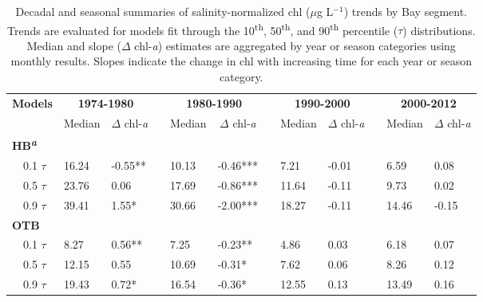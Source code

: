 \documentclass{svjour3}\usepackage[]{graphicx}\usepackage[]{color}
\newcommand{\mugl}{$\mu$g L$^{-1}$}
\begin{document}
\begin{table}[!tbp]
\caption{Decadal and seasonal summaries of salinity-normalized \ac{chl} (\mugl) trends by Bay segment. Trends are evaluated for models fit through the 10\textsuperscript{th}, 50\textsuperscript{th}, and 90\textsuperscript{th} percentile ($\tau$) distributions.  Median and slope ($\Delta$ chl-\textit{a}) estimates are aggregated by year or season categories using monthly results.  Slopes indicate the change in \ac{chl} with increasing time for each year or season category.\label{tab:trendsal}} 
\begin{center}
\begin{tabular}{lllcllcllcll}
\hline\hline
\multicolumn{1}{l}{\bfseries Models}&\multicolumn{2}{c}{\bfseries {\bf 1974-1980}}&\multicolumn{1}{c}{\bfseries }&\multicolumn{2}{c}{\bfseries {\bf 1980-1990}}&\multicolumn{1}{c}{\bfseries }&\multicolumn{2}{c}{\bfseries {\bf 1990-2000}}&\multicolumn{1}{c}{\bfseries }&\multicolumn{2}{c}{\bfseries {\bf 2000-2012}}\tabularnewline
\cline{2-3} \cline{5-6} \cline{8-9} \cline{11-12}
\multicolumn{1}{l}{}&\multicolumn{1}{c}{Median}&\multicolumn{1}{c}{$\Delta$ chl-\textit{a}}&\multicolumn{1}{c}{}&\multicolumn{1}{c}{Median}&\multicolumn{1}{c}{$\Delta$ chl-\textit{a}}&\multicolumn{1}{c}{}&\multicolumn{1}{c}{Median}&\multicolumn{1}{c}{$\Delta$ chl-\textit{a}}&\multicolumn{1}{c}{}&\multicolumn{1}{c}{Median}&\multicolumn{1}{c}{$\Delta$ chl-\textit{a}}\tabularnewline
\hline
{\bfseries HB\textsuperscript{\textit{a}}}&&&&&&&&&&&\tabularnewline
~~0.1 $\tau$&16.24&-0.55**&&10.13&-0.46***&& 7.21&-0.01 && 6.59& 0.08 \tabularnewline
~~0.5 $\tau$&23.76& 0.06 &&17.69&-0.86***&&11.64&-0.11 && 9.73& 0.02 \tabularnewline
~~0.9 $\tau$&39.41& 1.55*&&30.66&-2.00***&&18.27&-0.11 &&14.46&-0.15 \tabularnewline
\hline
{\bfseries OTB}&&&&&&&&&&&\tabularnewline
~~0.1 $\tau$& 8.27& 0.56**&& 7.25&-0.23**&& 4.86& 0.03 && 6.18& 0.07 \tabularnewline
~~0.5 $\tau$&12.15& 0.55 &&10.69&-0.31*&& 7.62& 0.06 && 8.26& 0.12 \tabularnewline
~~0.9 $\tau$&19.43& 0.72*&&16.54&-0.36*&&12.55& 0.13 &&13.49& 0.16 \tabularnewline

\end{tabular}
\end{center}
\end{table}
\end{document}
